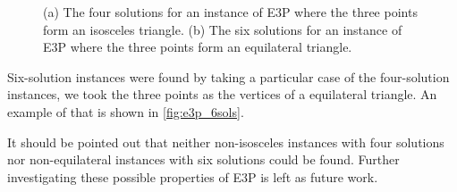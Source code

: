 \begin{figure}[!htb]
\begin{subfigure}{.5\textwidth}
		\caption{}
		\label{fig:e3p_6sols}
	\end{subfigure}
\caption{(a) The four solutions for an instance of E3P where the three points form an isosceles triangle. (b) The six solutions for an instance of E3P where the three points form an equilateral triangle.}
\end{figure}

Six-solution instances were found by taking a particular case of the four-solution instances, we took the three points as the vertices of a equilateral triangle. An example of that is shown in \autoref{fig:e3p_6sols}.

It should be pointed out that neither non-isosceles instances with four solutions nor non-equilateral instances with six solutions could be found. Further investigating these possible properties of E3P is left as future work.
